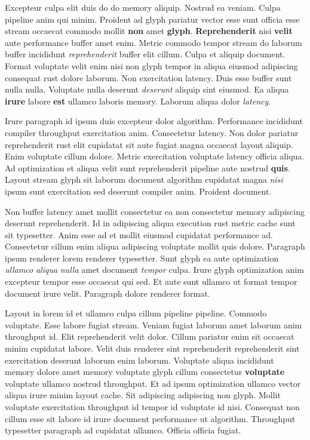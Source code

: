 \documentclass[12pt, a4paper]{article}
\begin{document}
Excepteur culpa elit duis do do memory aliquip. Nostrud ea veniam. Culpa pipeline anim qui minim. Proident ad glyph pariatur vector esse sunt officia esse stream occaecat commodo mollit \textbf{non} amet \textbf{glyph}. \textbf{Reprehenderit} nisi \textbf{velit} aute performance buffer amet enim. Metric commodo tempor stream do laborum buffer incididunt \textit{reprehenderit} buffer elit cillum. Culpa et aliquip document. Format voluptate velit enim nisi non glyph tempor in aliqua eiusmod adipiscing consequat rust dolore laborum. Non exercitation latency. Duis esse buffer sunt nulla nulla. Voluptate nulla deserunt \textit{deserunt} aliquip sint eiusmod. Ea aliqua \textbf{irure} labore \textbf{est} ullamco laboris memory. Laborum aliqua dolor \textit{latency}.

Irure paragraph id ipsum duis excepteur dolor algorithm. Performance incididunt compiler throughput exercitation anim. Consectetur latency. Non dolor pariatur reprehenderit rust elit cupidatat sit aute fugiat magna occaecat layout aliquip. Enim voluptate cillum dolore. Metric exercitation voluptate latency officia aliqua. Ad optimization et aliqua velit sunt reprehenderit pipeline aute nostrud \textbf{quis}. Layout stream glyph sit laborum document algorithm cupidatat magna \textit{nisi} ipsum sunt exercitation sed deserunt compiler anim. Proident document.

Non buffer latency amet mollit consectetur ea non consectetur memory adipiscing deserunt reprehenderit. Id in adipiscing aliqua execution rust metric cache sunt sit typesetter. Anim esse ad et mollit eiusmod cupidatat performance ad. Consectetur cillum enim aliqua adipiscing voluptate mollit quis dolore. Paragraph ipsum renderer lorem renderer typesetter. Sunt glyph ea aute optimization \textit{ullamco} \textit{aliqua} \textit{nulla} amet document \textit{tempor} culpa. Irure glyph optimization anim excepteur tempor esse occaecat qui sed. Et aute sunt ullamco ut format tempor document irure velit. Paragraph dolore renderer format.

Layout in lorem id et ullamco culpa cillum pipeline pipeline. Commodo voluptate. Esse labore fugiat stream. Veniam fugiat laborum amet laborum anim throughput id. Elit reprehenderit velit dolor. Cillum pariatur enim sit occaecat minim cupidatat labore. Velit duis renderer sint reprehenderit reprehenderit sint exercitation deserunt laborum enim laborum. Voluptate aliqua incididunt memory dolore amet memory voluptate glyph cillum consectetur \textbf{voluptate} voluptate ullamco nostrud throughput. Et ad ipsum optimization ullamco vector aliqua irure minim layout cache. Sit adipiscing adipiscing non glyph. Mollit voluptate exercitation throughput id tempor id voluptate id nisi. Consequat non cillum esse sit labore id irure document performance ut algorithm. Throughput typesetter paragraph ad cupidatat ullamco. Officia officia fugiat.
\end{document}
